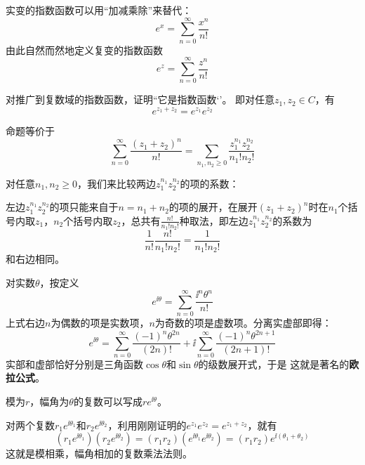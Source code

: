 \documentclass[CJK]{beamer}
\begin{document}
\begin{frame}
  \bch
  实变的指数函数可以用“加减乘除”来替代：
  $$ e^x  = \sum_{n=0}^{\infty} \frac{x^n}{n!}$$
  由此自然而然地定义复变的指数函数
  $$ e^z = \sum_{n=0}^{\infty} \frac{z^n}{n!}$$
  \ech
\end{frame}

\begin{frame}
  \bch
  
  对推广到复数域的指数函数，证明``它是指数函数‘’。
  即对任意$z_1, z_2\in C$，有
  $$e^{z_1+z_2} = e^{z_1}e^{z_2}$$
  \ech
\end{frame}


\begin{frame}
  \bch
  命题等价于
  $$\sum_{n=0}^\infty \frac{(z_1+z_2)^n}{n!} = \sum_{n_1, n_2\ge 0}\frac{z_1^{n_1}z_2^{n_2}}{n_1!n_2!}$$

  对任意$n_1,n_2\ge0$，我们来比较两边$z_1^{n_1}z_2^{n_2}$的项的系数：
  
  左边$z_1^{n_1}z_2^{n_2}$的项只能来自于$n=n_1+n_2$的项的展开，在展开$(z_1+z_2)^n$时在$n_1$个括号内取$z_1$，$n_2$个括号内取$z_2$，总共有$\frac{n!}{n_1!n_2!}$种取法，即左边$z_1^{n_1}z_2^{n_2}$的系数为
  $$\frac{1}{n!} \frac{n!}{n_1!n_2!} = \frac{1}{n_1!n_2!}$$
  和右边相同。
  \ech
\end{frame}

\begin{frame}
  \bch
  对实数$\theta$，按定义
  $$e^{\ii\theta} = \sum_{n=0}^\infty \frac{\ii^n\theta^n}{n!} $$
  上式右边$n$为偶数的项是实数项，$n$为奇数的项是虚数项。分离实虚部即得：
  $$e^{\ii\theta} = \sum_{n=0}^\infty \frac{(-1)^n\theta^{2n}}{(2n)!} + \ii  \sum_{n=0}^\infty \frac{(-1)^n\theta^{2n+1}}{(2n+1)!}$$
  实部和虚部恰好分别是三角函数$\cos\theta$和$\sin\theta$的级数展开式，于是
  这就是著名的{\bf\blue 欧拉公式}。
  \ech
\end{frame}

\begin{frame}
  \bch
      {\blue 模为$r$，幅角为$\theta$的复数可以写成$re^{\ii\theta}$。}
      
  对两个复数$r_1e^{\ii \theta_1}$和$r_2e^{\ii\theta_2}$，利用刚刚证明的$e^{z_1}e^{z_2} =e^{z_1+z_2}$，就有
  $$\left(r_1e^{\ii \theta_1}\right)\left(r_2e^{\ii\theta_2}\right) = (r_1r_2)\left(e^{\ii\theta_1}e^{\ii\theta_2}\right)= (r_1r_2)e^{\ii(\theta_1+\theta_2)}$$
      这就是模相乘，幅角相加的复数乘法法则。  
  
  \ech
\end{frame}
\end{document}
